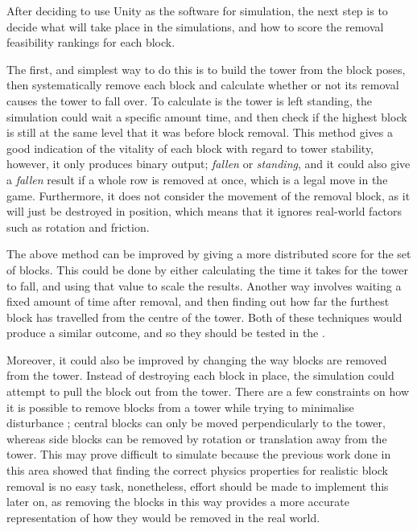 After deciding to use Unity as the software for simulation, the next step is to decide what will take place in the simulations, and how to score the removal feasibility rankings for each block.

The first, and simplest way to do this is to build the tower from the block poses, then systematically remove each block and calculate whether or not its removal causes the tower to fall over. To calculate is the tower is left standing, the simulation could wait a specific amount time, and then check if the highest block is still at the same level that it was before block removal. This method gives a good indication of the vitality of each block with regard to tower stability, however, it only produces binary output; \textit{fallen} or \textit{standing}, and it could also give a \textit{fallen} result if a whole row is removed at once, which is a legal move in the game. Furthermore, it does not consider the movement of the removal block, as it will just be destroyed in position, which means that it ignores real-world factors such as rotation and friction.

The above method can be improved by giving a more distributed score for the set of blocks. This could be done by either calculating the time it takes for the tower to fall, and using that value to scale the results. Another way involves waiting a fixed amount of time after removal, and then finding out how far the furthest block has travelled from the centre of the tower. Both of these techniques would produce a similar outcome, and so they should be tested in the .

Moreover, it could also be improved by changing the way blocks are removed from the tower. Instead of destroying each block in place, the simulation could attempt to pull the block out from the tower. There are a few constraints on how it is possible to remove blocks from a tower while trying to minimalise disturbance \citep{jengaanalysis}; central blocks can only be moved perpendicularly to the tower, whereas side blocks can be removed by rotation or translation away from the tower. This may prove difficult to simulate because the previous work done in this area showed that finding the correct physics properties for realistic block removal is no easy task, nonetheless, effort should be made to implement this later on, as removing the blocks in this way provides a more accurate representation of how they would be removed in the real world.


